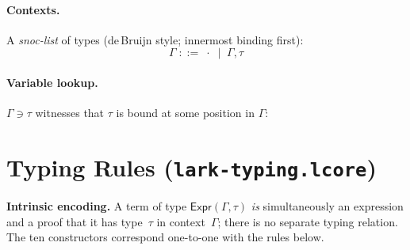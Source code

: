 \documentclass[10pt,a4paper]{article}
\newcommand{\TInt}{\mathsf{Int}}
\newcommand{\TFlt}{\mathsf{Float}}
\newcommand{\TBool}{\mathsf{Bool}}
\newcommand{\TStr}{\mathsf{Str}}
\newcommand{\TUnit}{\mathsf{Unit}}
\newcommand{\hasty}[3]{#1 \vdash #2 : #3}       %
\newcommand{\inctx}[2]{#1 \ni #2}               %
\newcommand{\klet}{\mathbf{let}}
\newcommand{\kin}{\mathbf{in}}
\newcommand{\kif}{\mathbf{if}}
\newcommand{\kthen}{\mathbf{then}}
\newcommand{\kelse}{\mathbf{else}}
\newcommand{\lfile}[1]{\texttt{#1}}
\theoremstyle{plain}
\theoremstyle{definition}
\theoremstyle{remark}
\begin{document}
\paragraph{Contexts.}
A \emph{snoc-list} of types (de\,Bruijn style; innermost binding first):
\[
\Gamma \;::=\; \cdot \;\mid\; \Gamma,\tau
\]

\paragraph{Variable lookup.}
$\inctx{\Gamma}{\tau}$ witnesses that $\tau$ is bound at some position in $\Gamma$:

\section{Typing Rules (\lfile{lark-typing.lcore})}
\label{sec:typing}

\noindent\textbf{Intrinsic encoding.}  A term of type
$\mathsf{Expr}(\Gamma,\tau)$ \emph{is} simultaneously an expression and a proof
that it has type~$\tau$ in context~$\Gamma$; there is no separate typing
relation.  The ten constructors correspond one-to-one with the rules below.

\end{document}

